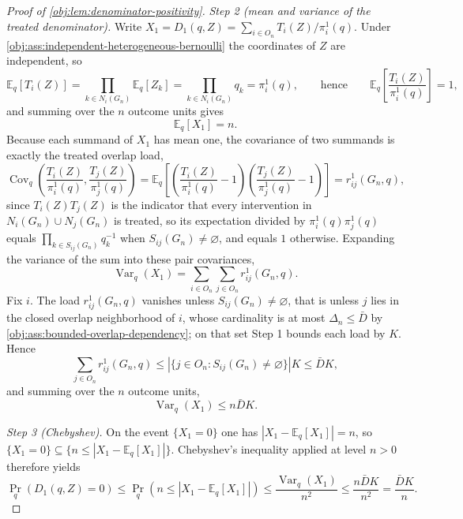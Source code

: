 \begin{proof}[Proof of \cref{obj:lem:denominator-positivity}]
\textit{Step 2 (mean and variance of the treated denominator).} Write \(X_1=D_1(q,Z)=\sum_{i\in O_n}T_i(Z)/\pi_i^1(q)\). Under \cref{obj:ass:independent-heterogeneous-bernoulli} the coordinates of \(Z\) are independent, so
\[
\mathbb E_q\!\left[T_i(Z)\right]
=\prod_{k\in N_i(G_n)}\mathbb E_q\!\left[Z_k\right]
=\prod_{k\in N_i(G_n)}q_k
=\pi_i^1(q),
\qquad\text{hence}\qquad
\mathbb E_q\!\left[\frac{T_i(Z)}{\pi_i^1(q)}\right]=1 ,
\]
and summing over the \(n\) outcome units gives
\[
\mathbb E_q[X_1]=n .
\]
Because each summand of \(X_1\) has mean one, the covariance of two summands is exactly the treated overlap load,
\[
\operatorname{Cov}_q\!\left(\frac{T_i(Z)}{\pi_i^1(q)},\frac{T_j(Z)}{\pi_j^1(q)}\right)
=\mathbb E_q\!\left[
\left(\frac{T_i(Z)}{\pi_i^1(q)}-1\right)
\left(\frac{T_j(Z)}{\pi_j^1(q)}-1\right)\right]
=r_{ij}^1(G_n,q),
\]
since \(T_i(Z)T_j(Z)\) is the indicator that every intervention in \(N_i(G_n)\cup N_j(G_n)\) is treated, so its expectation divided by \(\pi_i^1(q)\pi_j^1(q)\) equals \(\prod_{k\in S_{ij}(G_n)}q_k^{-1}\) when \(S_{ij}(G_n)\neq\varnothing\), and equals \(1\) otherwise. Expanding the variance of the sum into these pair covariances,
\[
\operatorname{Var}_q(X_1)
=\sum_{i\in O_n}\sum_{j\in O_n}r_{ij}^1(G_n,q).
\]
Fix \(i\). The load \(r_{ij}^1(G_n,q)\) vanishes unless \(S_{ij}(G_n)\neq\varnothing\), that is unless \(j\) lies in the closed overlap neighborhood of \(i\), whose cardinality is at most \(\Delta_n\le\bar D\) by \cref{obj:ass:bounded-overlap-dependency}; on that set Step 1 bounds each load by \(K\). Hence
\[
\sum_{j\in O_n}r_{ij}^1(G_n,q)
\le\left|\{j\in O_n:S_{ij}(G_n)\neq\varnothing\}\right|K
\le\bar DK ,
\]
and summing over the \(n\) outcome units,
\[
\operatorname{Var}_q(X_1)\le n\bar DK .
\]

\textit{Step 3 (Chebyshev).} On the event \(\{X_1=0\}\) one has \(|X_1-\mathbb E_q[X_1]|=n\), so \(\{X_1=0\}\subseteq\{n\le|X_1-\mathbb E_q[X_1]|\}\). Chebyshev's inequality applied at level \(n>0\) therefore yields
\[
\Pr_q\!\left(D_1(q,Z)=0\right)
\le\Pr_q\!\left(n\le\left|X_1-\mathbb E_q[X_1]\right|\right)
\le\frac{\operatorname{Var}_q(X_1)}{n^2}
\le\frac{n\bar DK}{n^2}
=\frac{\bar DK}{n}.
\]


\end{proof}
